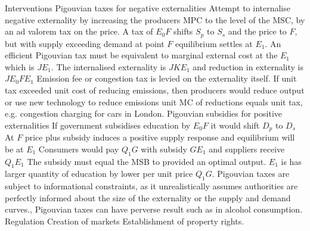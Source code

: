 \documentclass[12pt]{examnotes}
\begin{document}
 Interventions
 Pigouvian taxes for negative externalities 
\rna Attempt to internalise negative externality by increasing the producers MPC to the level of the MSC, by an ad valorem tax on the price.
\rna A tax of $E_0F$ shifts $S_p$ to $S_s$ and the price to $F$, but with supply exceeding demand at point $F$ equilibrium settles at $E_1$. 
\rna An efficient Pigouvian tax must be equivalent to marginal external cost at the $E_1$ which is $JE_1$.
\rna The internalised externality is $JKE_1$ and reduction in externality is $JE_0FE_1$
\rna Emission fee or congestion tax is levied on the externality itself. If unit tax exceeded unit cost of reducing emissions, then producers would reduce output or use new technology to reduce emissions unit MC of reductions equals unit tax, e.g. congestion charging for cars in London.
 Pigouvian subsidies for positive externalities 
\rna If government subsidises education by $E_0F$ it would shift $D_p$ to $D_s$
\rna At $F$ price plus subsidy induces a positive supply response and equilibrium will be at $E_1$
\rna Consumers would pay $Q_1G$ with subsidy $GE_1$ and suppliers receive $Q_1E_1$
\rna The subsidy must equal the MSB to provided an optimal output. 
\rna $E_1$ is has larger quantity of education by lower per unit price $Q_1G$.
\ra Pigouvian taxes are subject to informational constraints, as it unrealistically assumes authorities are perfectly informed about the size of the externality or the supply and demand curves.,
\ra Pigouvian taxes can have perverse result such as in alcohol consumption.
 Regulation
 Creation of markets
 Establishment of property rights.
\end{document}
